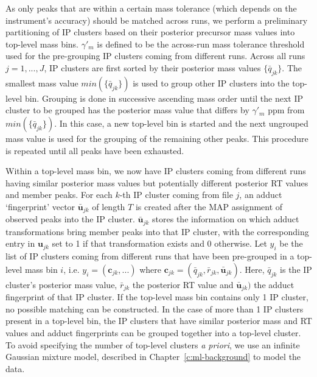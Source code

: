 As only peaks that are within a certain mass tolerance (which depends on the instrument's accuracy) should be matched across runs, we perform a preliminary partitioning of IP clusters based on their posterior precursor mass values into top-level mass bins. $\gamma'_m$ is defined to be the across-run mass tolerance threshold used for the pre-grouping IP clusters coming from different runs. Across all runs $j=1,...,J$, IP clusters are first sorted by their posterior mass values $\{{\bar{q}}_{jk}\}$. The smallest mass value $min(\{{\bar{q}}_{jk}\})$ is used to group other IP clusters into the top-level bin. Grouping is done in successive ascending mass order until the next IP cluster to be grouped has the posterior mass value that differs by $\gamma'_m$ ppm from $min(\{{\bar{q}}_{jk}\})$. In this case, a new top-level bin is started and the next ungrouped mass value is used for the grouping of the remaining other peaks. This procedure is repeated until all peaks have been exhausted.

Within a top-level mass bin, we now have IP clusters coming from different runs having similar posterior mass values but potentially different posterior RT values and member peaks. For each $k$-th IP cluster coming from file $j$, an adduct `fingerprint' vector $\boldsymbol{\bar{u}}_{jk}$ of length $T$ is created after the MAP assignment of observed peaks into the IP cluster. $\boldsymbol{\bar{u}}_{jk}$ stores the information on which adduct transformations bring member peaks into that IP cluster, with the corresponding entry in $\boldsymbol{u}_{jk}$ set to 1 if that transformation exists and 0 otherwise. Let $y_i$ be the list of IP clusters coming from different runs that have been pre-grouped in a top-level mass bin $i$, i.e. $y_i=(\boldsymbol{c}_{jk},...)$ where $\boldsymbol{c}_{jk}=({\bar{q}}_{jk}, {\bar{r}}_{jk}, \boldsymbol{\bar{u}}_{jk})$. Here, ${\bar{q}}_{jk}$ is the IP cluster's posterior mass value, ${\bar{r}}_{jk}$ the posterior RT value and $\boldsymbol{\bar{u}}_{jk})$ the adduct fingerprint of that IP cluster. If the top-level mass bin contains only 1 IP cluster, no possible matching can be constructed. In the case of more than 1 IP clusters present in a top-level bin, the IP clusters that have similar posterior mass and RT values and adduct fingerprints can be grouped together into a top-level cluster. To avoid specifying the number of top-level clusters \textit{a priori}, we use an infinite Gaussian mixture model, described in Chapter~\ref{c:ml-background} to model the data. 

